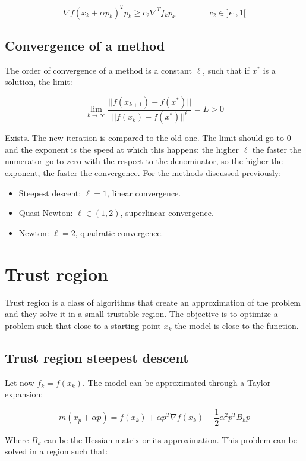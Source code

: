     $$\nabla f(x_k+\alpha p_k)^Tp_k \ge c_2\nabla^Tf_kp_x\qquad\qquad c_2\in]\epsilon_1, 1[$$

  \subsection{Convergence of a method}
  The order of convergence of a method is a constant $\ell$, such that if $x^*$ is a solution, the limit:

  $$\lim_{k \rightarrow \infty  }\frac{||f(x_{k+1})-f(x^*)||}{||f(x_{k})-f(x^*)||^\ell} = L >0$$

  Exists.
  The new iteration is compared to the old one.
  The limit should go to $0$ and the exponent is the speed at which this happens: the higher $\ell$ the faster the numerator go to zero with the respect to the denominator, so the higher the exponent, the faster the convergence.
  For the methods discussed previously:

  \begin{multicols}{2}
    \begin{itemize}
      \item Steepest descent: $\ell=1$, linear convergence.
      \item Quasi-Newton: $\ell \in (1,2)$, superlinear convergence.
      \item Newton: $\ell=2$, quadratic convergence.
    \end{itemize}
  \end{multicols}


\section{Trust region}
Trust region is a class of algorithms that create an approximation of the problem and they solve it in a small trustable region.
The objective is to optimize a problem such that close to a starting point $x_k$ the model is close to the function.

  \subsection{Trust region steepest descent}
  Let now $f_k = f(x_k)$.
  The model can be approximated through a Taylor expansion:

  $$m(x_p+\alpha p)=f(x_k)+\alpha p^T \nabla f(x_k)+ \frac{1}{2} \alpha^2p^T B_k p$$

  Where $B_k$ can be the Hessian matrix or its approximation.
  This problem can be solved in a region such that:

